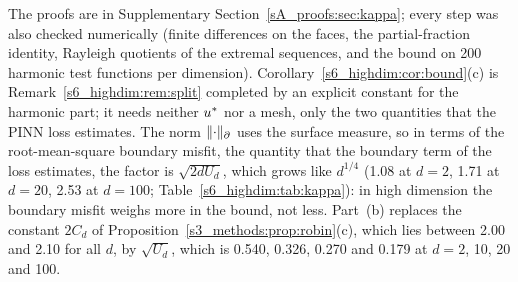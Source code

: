 \noindent The proofs are in Supplementary Section~\ref{sA_proofs:sec:kappa}; every step was also
checked numerically (finite differences on the faces, the partial-fraction identity, Rayleigh
quotients of the extremal sequences, and the bound on 200 harmonic test functions per dimension).
Corollary~\ref{s6_highdim:cor:bound}(c) is Remark~\ref{s6_highdim:rem:split} completed by an
explicit constant for the harmonic part; it needs neither $u^{*}$ nor a mesh, only the two
quantities that the PINN loss estimates. The norm $\lVert \cdot\rVert_{\partial}$ uses the surface measure, so in
terms of the root-mean-square boundary misfit, the quantity that the boundary term of the loss
estimates, the factor is $\sqrt{2dU_d}$, which grows like $d^{1/4}$ (1.08 at $d=2$, 1.71 at
$d=20$, 2.53 at $d=100$; Table~\ref{s6_highdim:tab:kappa}): in high dimension the boundary
misfit weighs more in the bound, not less.
Part~(b) replaces the constant $2C_d$ of Proposition~\ref{s3_methods:prop:robin}(c), which lies
between 2.00 and 2.10 for all $d$, by $\sqrt{U_d}$, which is 0.540, 0.326, 0.270 and 0.179 at
$d=2$, 10, 20 and 100.

